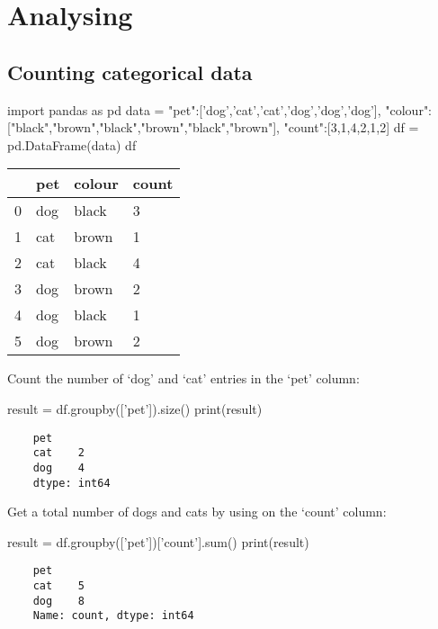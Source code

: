 \chapter{Analysing}
\label{chapter:analysing}

\section{Counting categorical data}

\begin{pycode}
    import pandas as pd
    data = {"pet":['dog','cat','cat','dog','dog','dog'],
            "colour":["black","brown","black","brown","black","brown"],
            "count":[3,1,4,2,1,2]}
    df = pd.DataFrame(data)
    df
\end{pycode}

\begin{tabular}{l l l l}
     & pet  &  colour & count \\
    \hline
    0&	dog&	    black	 &   3\\
    1&	cat&	    brown	 &   1\\
    2&	cat&	    black	 &   4\\
    3&	dog&	    brown	 &   2\\
    4&	dog&	    black	 &   1\\
    5&	dog&	    brown	  &  2\\
\end{tabular}

Count the number of `dog' and `cat' entries in the `pet' column:

\begin{pycode}
    result = df.groupby(['pet']).size()
    print(result)
\end{pycode}

\begin{verbatim}
    pet
    cat    2
    dog    4
    dtype: int64
\end{verbatim}

Get a total number of dogs and cats by using  on the `count' column:

\begin{pycode}
    result = df.groupby(['pet'])['count'].sum()
    print(result)
\end{pycode}

\begin{verbatim}
    pet
    cat    5
    dog    8
    Name: count, dtype: int64
\end{verbatim}


\newpage

